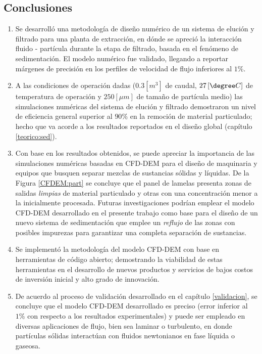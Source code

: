 \begin{center}
	\section{Conclusiones}
\end{center}


\begin{enumerate}
	\item Se desarroll\'o una metodolog\'ia de dise\~no num\'erico de un sistema de eluci\'on y filtrado para una planta de extracci\'on, en d\'onde se apreci\'o la interacci\'on fluido - part\'icula durante la etapa de filtrado, basada en el fen\'omeno de sedimentaci\'on. El modelo num\'erico fue validado, llegando a reportar m\'argenes de precisi\'on en los perfiles de velocidad de flujo inferiores al $1 \%$.
	\item A las condiciones de operaci\'on dadas ($0.3 \left[ m^3 \right]$ de caudal, $27 \left[ \degree C \right]$ de temperatura de operaci\'on y $250 [ \mu m]$ de tama\~no de part\'icula medio) las simulaciones num\'ericas del sistema de eluci\'on y filtrado demostraron un nivel de eficiencia general superior al $90 \%$ en la remoci\'on de material particulado; hecho que va acorde a los resultados reportados en el dise\~no global (cap\'itulo \ref{teorico:sed}).
	\item Con base en los resultados obtenidos, se puede apreciar la importancia de las simulaciones num\'ericas basadas en CFD-DEM para el dise\~no de maquinaria y equipos que busquen separar mezclas de sustancias s\'olidas y l\'iquidas. De la Figura \ref{CFDEM:part} se concluye que el panel de lamelas presenta zonas de salidas \textit{limpias} de material particulado y otras con una concentraci\'on menor a la inicialmente procesada. Futuras investigaciones podr\'ian emplear el modelo CFD-DEM desarrollado en el presente trabajo como base para el dise\~no de un nuevo sistema de sedimentaci\'on que emplee un \textit{reflujo} de las zonas con posibles impurezas para garantizar una completa separaci\'on de sustancias.
	\item Se implement\'o la metodolog\'ia del modelo CFD-DEM con base en herramientas de c\'odigo abierto; demostrando la viabilidad de estas herramientas en el desarrollo de nuevos productos y servicios de bajos costos de inversi\'on inicial y alto grado de innovaci\'on.
	\item De acuerdo al proceso de validaci\'on desarrollado en el cap\'itulo \ref{validacion}, se concluye que el modelo CFD-DEM desarrollado es preciso (error inferior al $1\%$ con respecto a los resultados experimentales) y puede ser empleado en diversas aplicaciones de flujo, bien sea laminar o turbulento, en donde part\'iculas s\'olidas interact\'uan con fluidos newtonianos en fase l\'iquida o gaseosa.
\end{enumerate}
